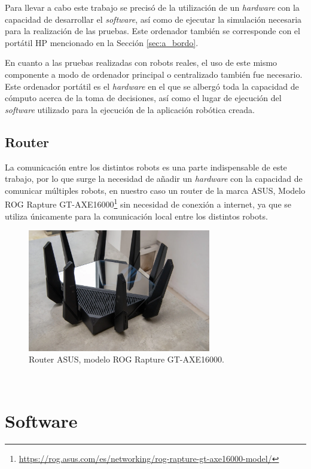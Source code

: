 Para llevar a cabo este trabajo se precisó de la utilización de un
\textit{hardware} con la capacidad de desarrollar el \textit{software}, así como
de ejecutar la simulación necesaria para la realización de las pruebas.
Este ordenador también se corresponde con el portátil HP mencionado en la
Sección \ref{sec:a_bordo}.

En cuanto a las pruebas realizadas con robots reales, el uso de este mismo
componente a modo de ordenador principal o centralizado también fue necesario.
Este ordenador portátil es el \textit{hardware} en el que se albergó toda la
capacidad de cómputo acerca de la toma de decisiones, así como el lugar de
ejecución del \textit{software} utilizado para la ejecución de la aplicación
robótica creada.

\subsection{Router}
\label{sec:router}

La comunicación entre los distintos robots es una parte indispensable de este
trabajo, por lo que surge la necesidad de añadir un \textit{hardware} con la
capacidad de comunicar múltiples robots, en nuestro caso un router de la marca
ASUS, Modelo ROG Rapture
GT-AXE16000\footnote{\url{https://rog.asus.com/es/networking/rog-rapture-gt-axe16000-model/}}
sin necesidad de conexión a internet, ya que se utiliza únicamente para la
comunicación local entre los distintos robots.

\begin{figure} [h!]
  \begin{center}
    \includegraphics[width=8cm]{figs/asus_router}
  \end{center}
  \caption{Router ASUS, modelo ROG Rapture GT-AXE16000.}
  \label{fig:asus_router}
\end{figure}\



\section{Software}
\label{sec:software}

